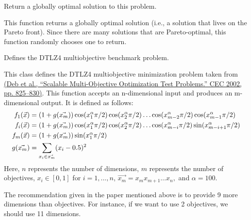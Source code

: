 \documentclass[letterpaper,10pt,english]{sphinxmanual}
\begin{document}
\begin{fulllineitems}
\begin{fulllineitems}
\label{reference:inspyred.benchmarks.DTLZ3.global_optimum}
Return a globally optimal solution to this problem.

This function returns a globally optimal solution (i.e., a 
solution that lives on the Pareto front). Since there are many
solutions that are Pareto-optimal, this function randomly 
chooses one to return.

\end{fulllineitems}


\end{fulllineitems}


\begin{fulllineitems}
\label{reference:inspyred.benchmarks.DTLZ4}
Defines the DTLZ4 multiobjective benchmark problem.

This class defines the DTLZ4 multiobjective minimization problem
taken from \href{http://www.tik.ee.ethz.ch/sop/download/supplementary/testproblems/dtlz1/index.php}{(Deb et al., ``Scalable Multi-Objective Optimization Test Problems.''
CEC 2002, pp. 825--830)}.
This function accepts an n-dimensional input and produces an m-dimensional output.
It is defined as follows:
\begin{gather}
\begin{split}f_1(\vec{x}) &= (1 + g(\vec{x_m}))\cos(x_1^\alpha \pi/2)\cos(x_2^\alpha \pi/2)\dots\cos(x_{m-2}^\alpha \pi/2)\cos(x_{m-1}^\alpha \pi/2) \\
f_i(\vec{x}) &= (1 + g(\vec{x_m}))\cos(x_1^\alpha \pi/2)\cos(x_2^\alpha \pi/2)\dots\cos(x_{m-i}^\alpha \pi/2)\sin(x_{m-i+1}^\alpha \pi/2) \\
f_m(\vec{x}) &= (1 + g(\vec{x_m}))\sin(x_1^\alpha \pi/2) \\
g(\vec{x_m}) &= \sum_{x_i \in \vec{x_m}}(x_i - 0.5)^2 \\\end{split}\notag
\end{gather}
Here, $n$ represents the number of dimensions, $m$ represents the
number of objectives, $x_i \in [0, 1]$ for $i=1,...,n$,  
$\vec{x_m} = x_m x_{m+1} \dots x_{n},$ and $\alpha=100.$

The recommendation given in the paper mentioned above is to provide 9 more
dimensions than objectives. For instance, if we want to use 2 objectives, we
should use 11 dimensions.


\end{fulllineitems}
\end{document}
